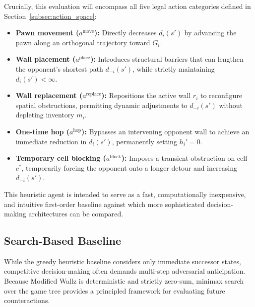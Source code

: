 \documentclass{article}
\begin{document}
Crucially, this evaluation will encompass all five legal action categories defined in Section~\ref{subsec:action_space}:
\begin{itemize}
    \item \textbf{Pawn movement ($a^{\text{move}}$):} Directly decreases $d_i(s')$ by advancing the pawn along an orthogonal trajectory toward $G_i$.
    \item \textbf{Wall placement ($a^{\text{place}}$):} Introduces structural barriers that can lengthen the opponent's shortest path $d_{-i}(s')$, while strictly maintaining $d_i(s') < \infty$.
    \item \textbf{Wall replacement ($a^{\text{replace}}$):} Repositions the active wall $r_i$ to reconfigure spatial obstructions, permitting dynamic adjustments to $d_{-i}(s')$ without depleting inventory $m_i$.
    \item \textbf{One-time hop ($a^{\text{hop}}$):} Bypasses an intervening opponent wall to achieve an immediate reduction in $d_i(s')$, permanently setting $h_i' = 0$.
    \item \textbf{Temporary cell blocking ($a^{\text{block}}$):} Imposes a transient obstruction on cell $c^*$, temporarily forcing the opponent onto a longer detour and increasing $d_{-i}(s')$.
\end{itemize}
This heuristic agent is intended to serve as a fast, computationally inexpensive, and intuitive first-order baseline against which more sophisticated decision-making architectures can be compared.

\subsection{Search-Based Baseline}
\label{subsec:search_baseline}

While the greedy heuristic baseline considers only immediate successor states, competitive decision-making often demands multi-step adversarial anticipation. Because Modified Wallz is deterministic and strictly zero-sum, minimax search over the game tree provides a principled framework for evaluating future counteractions.
\end{document}
